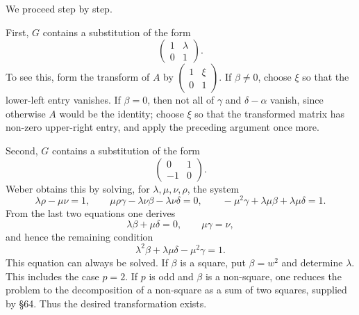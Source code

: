 \documentclass[11pt,a4paper]{article}
\begin{document}
We proceed step by step.

First, \(G\) contains a substitution of the form
\begin{equation}\label{eq:66-3}
 \begin{pmatrix}1&\lambda\\0&1\end{pmatrix}.
\end{equation}
To see this, form the transform of \(A\) by \(\begin{pmatrix}1&\xi\\0&1\end{pmatrix}\).  If \(\beta\ne0\), choose \(\xi\) so that the lower-left entry vanishes.  If \(\beta=0\), then not all of \(\gamma\) and \(\delta-\alpha\) vanish, since otherwise \(A\) would be the identity; choose \(\xi\) so that the transformed matrix has non-zero upper-right entry, and apply the preceding argument once more.

Second, \(G\) contains a substitution of the form
\begin{equation}\label{eq:66-5}
 \begin{pmatrix}0&1\\-1&0\end{pmatrix}.
\end{equation}
Weber obtains this by solving, for \(\lambda,\mu,\nu,\rho\), the system
\begin{equation}\label{eq:66-6}
 \lambda\rho-\mu\nu=1,
 \qquad \mu\rho\gamma-\lambda\nu\beta-\lambda\nu\delta=0,
 \qquad -\mu^2\gamma+\lambda\mu\beta+\lambda\mu\delta=1.
\end{equation}
From the last two equations one derives
\begin{equation}\label{eq:66-7}
 \lambda\beta+\mu\delta=0,
 \qquad \mu\gamma=\nu,
\end{equation}
and hence the remaining condition
\begin{equation}\label{eq:66-8}
 \lambda^2\beta+\lambda\mu\delta-\mu^2\gamma=1.
\end{equation}
This equation can always be solved.  If \(\beta\) is a square, put \(\beta=w^2\) and determine \(\lambda\).  This includes the case \(p=2\).  If \(p\) is odd and \(\beta\) is a non-square, one reduces the problem to the decomposition of a non-square as a sum of two squares, supplied by \S 64.  Thus the desired transformation exists.
\end{document}
